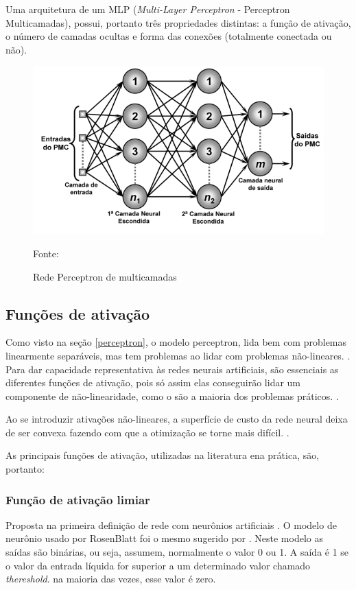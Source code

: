 Uma arquitetura de um MLP (\textit{Multi-Layer Perceptron} - Perceptron Multicamadas), possui, portanto três propriedades distintas: a função de ativação, o número de camadas ocultas e forma das conexões (totalmente conectada ou não).

\begin{figure}[h!]
	\centering
	\includegraphics[width=.7\textwidth]{imagens/pmc.png}	
	\caption{Rede Perceptron de multicamadas}
	{\scriptsize 	Fonte: \cite[p. 92]{silva_redes_2016}}
	\label{fig:pmc}
\end{figure}

\subsection{Funções de ativação}\label{funcoes_ativacao}
Como visto na seção \ref{perceptron}, o modelo perceptron, lida bem com problemas linearmente separáveis, mas tem problemas ao lidar com problemas  não-lineares. \cite{haykin_redes_2001}. Para dar capacidade representativa às redes neurais artificiais, são essenciais as diferentes funções de ativação, pois só assim elas conseguirão lidar um componente de não-linearidade, como o são a maioria dos problemas práticos. \cite{hagan_neural_1996}.

Ao se introduzir ativações não-lineares, a superfície de custo da rede neural deixa de ser convexa fazendo com que a otimização se torne mais difícil. \cite{minsky_perceptrons:_1969} \cite{haykin_redes_2001}.

As principais funções de ativação, utilizadas na literatura ena prática, são, portanto:

\subsubsection{Função de ativação limiar}\label{ativacao:limiar}
Proposta na primeira definição de rede com neurônios artificiais \cite{rosenblatt_perceptron:_1958}. O modelo de neurônio usado por RosenBlatt foi o mesmo sugerido por \cite{mcculloch_logical_1943}. Neste modelo as saídas são binárias, ou seja, assumem, normalmente o valor 0 ou 1. A saída é 1 se o valor da entrada líquida for superior a um determinado valor chamado \textit{thereshold}. na maioria das vezes, esse valor é zero.

